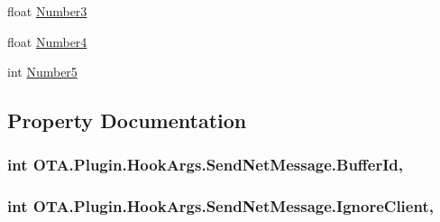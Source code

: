 \begin{DoxyCompactItemize}
float \hyperlink{struct_o_t_a_1_1_plugin_1_1_hook_args_1_1_send_net_message_a2db0671ebae5b42cec034dd672bfef4c}{Number3}
\item 
float \hyperlink{struct_o_t_a_1_1_plugin_1_1_hook_args_1_1_send_net_message_a4ac3c63072473cb697976fcffbe3f089}{Number4}
\item 
int \hyperlink{struct_o_t_a_1_1_plugin_1_1_hook_args_1_1_send_net_message_a68d39afbbb16fe0f52fcd8986b11f0d3}{Number5}
\end{DoxyCompactItemize}


\subsection{Property Documentation}
\hypertarget{struct_o_t_a_1_1_plugin_1_1_hook_args_1_1_send_net_message_a7cf4641bae4db33382857265434f8f77}{}
\subsubsection[{Buffer\+Id}]{\setlength{\rightskip}{0pt plus 5cm}int O\+T\+A.\+Plugin.\+Hook\+Args.\+Send\+Net\+Message.\+Buffer\+Id\hspace{0.3cm}{\ttfamily [get]}, {\ttfamily [set]}}\label{struct_o_t_a_1_1_plugin_1_1_hook_args_1_1_send_net_message_a7cf4641bae4db33382857265434f8f77}
\hypertarget{struct_o_t_a_1_1_plugin_1_1_hook_args_1_1_send_net_message_a3ea5168e9b5da4cc749d9f844373d880}{}
\subsubsection[{Ignore\+Client}]{\setlength{\rightskip}{0pt plus 5cm}int O\+T\+A.\+Plugin.\+Hook\+Args.\+Send\+Net\+Message.\+Ignore\+Client\hspace{0.3cm}{\ttfamily [get]}, {\ttfamily [set]}}\label{struct_o_t_a_1_1_plugin_1_1_hook_args_1_1_send_net_message_a3ea5168e9b5da4cc749d9f844373d880}
\hypertarget{struct_o_t_a_1_1_plugin_1_1_hook_args_1_1_send_net_message_a66ae46e7495444da0179f5cb1f9e0812}{}
